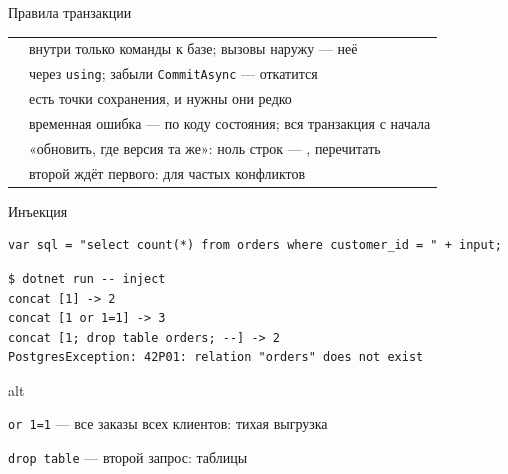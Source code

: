 \documentclass[aspectratio=169,10pt,t]{beamer}
\newcommand{\codesm}{\ttfamily\fontsize{7.6}{9.0}\selectfont}
\newcommand{\termsm}{\ttfamily\fontsize{6.6}{7.9}\selectfont}
\begin{document}
\begin{frame}{Правила транзакции}
  \slidetop
  {\renewcommand{\arraystretch}{1.45}\small
  \begin{tabular}{@{}L{3.9cm}L{8.9cm}@{}}
            & внутри только команды к базе; вызовы наружу
      ---  неё \\
           & через \texttt{using}; забыли \texttt{CommitAsync} ---
      откатится \\
       & есть точки сохранения, и нужны они редко \\
              & временная ошибка --- по коду состояния; вся
      транзакция с начала \\
       & «обновить, где версия та же»: ноль строк ---
      , перечитать \\
     & второй ждёт первого: для частых
      конфликтов \\
  \end{tabular}}

\end{frame}

\begin{frame}[plain]
\end{frame}

\begin{frame}[fragile]{Инъекция}
  \slidetop

\begin{lstlisting}[style=csharp,basicstyle=\codesm]
var sql = "select count(*) from orders where customer_id = " + input;
\end{lstlisting}

\begin{lstlisting}[style=term,basicstyle=\termsm]
$ dotnet run -- inject
concat [1] -> 2
concat [1 or 1=1] -> 3
concat [1; drop table orders; --] -> 2
PostgresException: 42P01: relation "orders" does not exist
\end{lstlisting}

  \begin{cbul}{alt}
    \item \texttt{or 1=1} --- все заказы всех клиентов: тихая выгрузка
    \item \texttt{drop table} --- второй запрос: таблицы 
  \end{cbul}
\end{frame}
\end{document}
